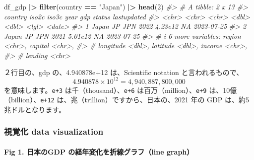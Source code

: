 \documentclass[
  xelatex, ja=standard]{bxjsbook}
\newenvironment{Shaded}{\begin{snugshade}}{\end{snugshade}}
\newcommand{\CommentTok}[1]{\textcolor[rgb]{0.56,0.35,0.01}{\textit{#1}}}
\newcommand{\DecValTok}[1]{\textcolor[rgb]{0.00,0.00,0.81}{#1}}
\newcommand{\FunctionTok}[1]{\textcolor[rgb]{0.13,0.29,0.53}{\textbf{#1}}}
\newcommand{\NormalTok}[1]{#1}
\newcommand{\SpecialCharTok}[1]{\textcolor[rgb]{0.81,0.36,0.00}{\textbf{#1}}}
\newcommand{\StringTok}[1]{\textcolor[rgb]{0.31,0.60,0.02}{#1}}
\theoremstyle{definition}
\theoremstyle{definition}
\theoremstyle{definition}
\theoremstyle{definition}
\theoremstyle{remark}
\begin{document}
\begin{Shaded}
\begin{Highlighting}[]
\NormalTok{df\_gdp }\SpecialCharTok{|\textgreater{}} \FunctionTok{filter}\NormalTok{(country }\SpecialCharTok{==} \StringTok{"Japan"}\NormalTok{) }\SpecialCharTok{|\textgreater{}} \FunctionTok{head}\NormalTok{(}\DecValTok{2}\NormalTok{)}
\CommentTok{\#\textgreater{} \# A tibble: 2 x 13}
\CommentTok{\#\textgreater{}   country iso2c iso3c  year     gdp status lastupdated}
\CommentTok{\#\textgreater{}   \textless{}chr\textgreater{}   \textless{}chr\textgreater{} \textless{}chr\textgreater{} \textless{}dbl\textgreater{}   \textless{}dbl\textgreater{} \textless{}lgl\textgreater{}  \textless{}date\textgreater{}     }
\CommentTok{\#\textgreater{} 1 Japan   JP    JPN    2022 4.23e12 NA     2023{-}07{-}25 }
\CommentTok{\#\textgreater{} 2 Japan   JP    JPN    2021 5.01e12 NA     2023{-}07{-}25 }
\CommentTok{\#\textgreater{} \# i 6 more variables: region \textless{}chr\textgreater{}, capital \textless{}chr\textgreater{},}
\CommentTok{\#\textgreater{} \#   longitude \textless{}dbl\textgreater{}, latitude \textless{}dbl\textgreater{}, income \textless{}chr\textgreater{},}
\CommentTok{\#\textgreater{} \#   lending \textless{}chr\textgreater{}}
\end{Highlighting}
\end{Shaded}

２行目の、gdp の、4.940878e+12 は、Scientific notation と言われるもので、 \[4.940878 \times 10^{12} = 4,940,887,800,000\] を意味します。\texttt{e+3} は千（thousand）、\texttt{e+6} は百万（million）、\texttt{e+9} は、10億（billion）、\texttt{e+12} は、兆（trillion）ですから、日本の、2021 年の GDP は、約5兆ドルとなります。

\hypertarget{ux8996ux899aux5316-data-visualization-1}{%
\subsubsection{視覚化 data visualization}\label{ux8996ux899aux5316-data-visualization-1}}

\hypertarget{fig-1.-ux65e5ux672cux306egdp-ux306eux7d4cux5e74ux5909ux5316ux3092ux6298ux7ddaux30b0ux30e9ux30d5line-graph}{%
\paragraph{Fig 1. 日本のGDP の経年変化を折線グラフ（line graph）}\label{fig-1.-ux65e5ux672cux306egdp-ux306eux7d4cux5e74ux5909ux5316ux3092ux6298ux7ddaux30b0ux30e9ux30d5line-graph}}
\end{document}
